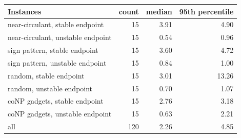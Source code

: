 \begin{tabular}{@{}lrrr@{}}
\toprule
Instances & count & median & 95th percentile \\
\midrule
near-circulant, stable endpoint & 15 & 3.91 & 4.90 \\
near-circulant, unstable endpoint & 15 & 0.54 & 0.96 \\
sign pattern, stable endpoint & 15 & 3.60 & 4.72 \\
sign pattern, unstable endpoint & 15 & 0.84 & 1.00 \\
random, stable endpoint & 15 & 3.01 & 13.26 \\
random, unstable endpoint & 15 & 0.70 & 1.07 \\
coNP gadgets, stable endpoint & 15 & 2.76 & 3.18 \\
coNP gadgets, unstable endpoint & 15 & 0.63 & 2.21 \\
\midrule
all & 120 & 2.26 & 4.85 \\
\bottomrule
\end{tabular}
